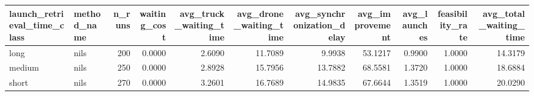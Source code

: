 \begin{tabular}{llrrrrrrrrr}
\toprule
launch_retrieval_time_class & method_name & n_runs & waiting_cost & avg_truck_waiting_time & avg_drone_waiting_time & avg_synchronization_delay & avg_improvement & avg_launches & feasibility_rate & avg_total_waiting_time \\
\midrule
long & nils & 200 & 0.0000 & 2.6090 & 11.7089 & 9.9938 & 53.1217 & 0.9900 & 1.0000 & 14.3179 \\
medium & nils & 250 & 0.0000 & 2.8928 & 15.7956 & 13.7882 & 68.5581 & 1.3720 & 1.0000 & 18.6884 \\
short & nils & 270 & 0.0000 & 3.2601 & 16.7689 & 14.9835 & 67.6644 & 1.3519 & 1.0000 & 20.0290 \\
\bottomrule
\end{tabular}
